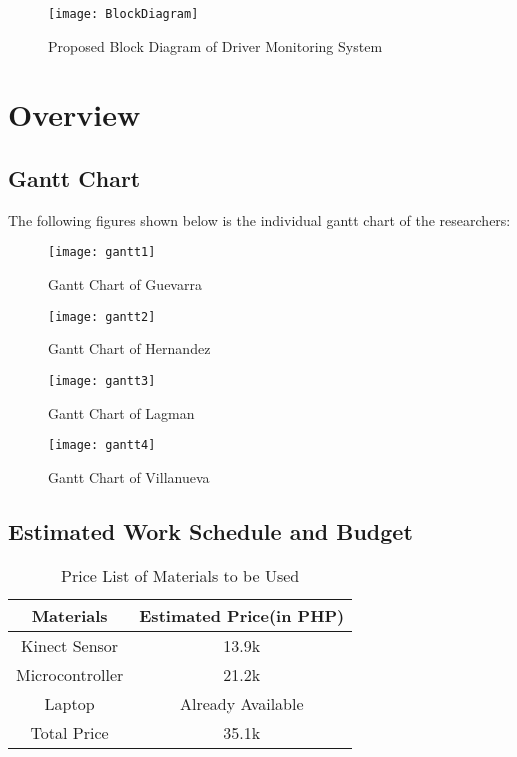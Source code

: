 \begin{center}
	\begin{figure}[ht]
		\centering
		\texttt{[image: BlockDiagram]}
		\caption{Proposed Block Diagram of Driver Monitoring System}
	\end{figure}
\end{center}
\newpage
\section{Overview}

\subsection{Gantt Chart}
The following figures shown below is the individual gantt chart of the researchers:

\begin{figure}[!htb]
	\centering
	\texttt{[image: gantt1]}
	\caption{Gantt Chart of Guevarra}
\end{figure}
\begin{figure}[!htb]
	\centering
	\texttt{[image: gantt2]}
	\caption{Gantt Chart of Hernandez}
\end{figure}
\begin{figure}[!htb]
	\centering
	\texttt{[image: gantt3]}
	\caption{Gantt Chart of Lagman}
\end{figure}
\begin{figure}[!htb]
	\centering
	\texttt{[image: gantt4]}
	\caption{Gantt Chart of Villanueva}
\end{figure}
\newpage
\newpage
\subsection{Estimated Work Schedule and Budget}
\begin{table}[!htb]
	\caption{Price List of Materials to be Used}
	\centering
	\begin{tabular}{|c|c|}
		\hline
		Materials & Estimated Price(in PHP) \\
		\hline
		Kinect Sensor & 13.9k \\
		\hline
		Microcontroller & 21.2k \\
		\hline
		Laptop & Already Available \\
		\hline
		Total Price & 35.1k \\
		\hline
	\end{tabular}
\end{table}